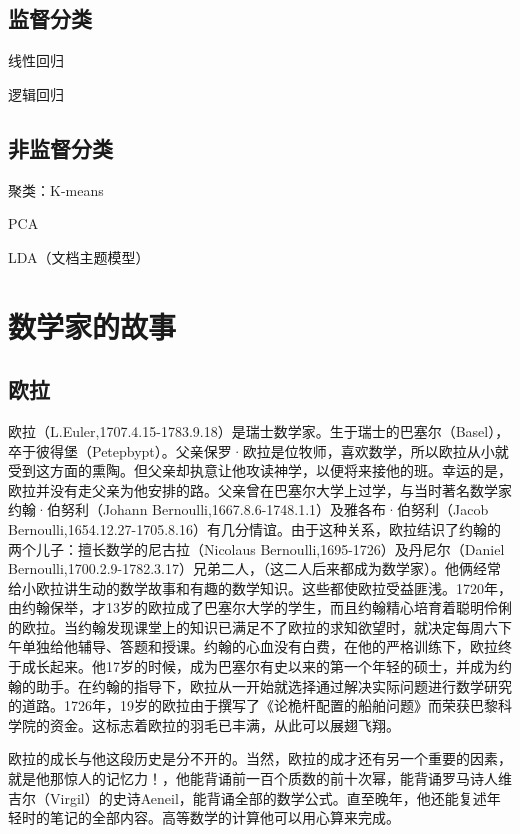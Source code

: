 \documentclass[UTF8]{ctexart}
\begin{document}
\subsection{监督分类}

线性回归

逻辑回归


\subsection{非监督分类}

聚类：K-means

PCA

LDA（文档主题模型）

\section{数学家的故事}

\subsection{欧拉}

欧拉（L.Euler,1707.4.15-1783.9.18）是瑞士数学家。生于瑞士的巴塞尔（Basel），卒于彼得堡（Petepbypt）。父亲保罗·欧拉是位牧师，喜欢数学，所以欧拉从小就受到这方面的熏陶。但父亲却执意让他攻读神学，以便将来接他的班。幸运的是，欧拉并没有走父亲为他安排的路。父亲曾在巴塞尔大学上过学，与当时著名数学家约翰·伯努利（Johann Bernoulli,1667.8.6-1748.1.1）及雅各布·伯努利（Jacob Bernoulli,1654.12.27-1705.8.16）有几分情谊。由于这种关系，欧拉结识了约翰的两个儿子：擅长数学的尼古拉（Nicolaus Bernoulli,1695-1726）及丹尼尔（Daniel Bernoulli,1700.2.9-1782.3.17）兄弟二人，（这二人后来都成为数学家）。他俩经常给小欧拉讲生动的数学故事和有趣的数学知识。这些都使欧拉受益匪浅。1720年，由约翰保举，才13岁的欧拉成了巴塞尔大学的学生，而且约翰精心培育着聪明伶俐的欧拉。当约翰发现课堂上的知识已满足不了欧拉的求知欲望时，就决定每周六下午单独给他辅导、答题和授课。约翰的心血没有白费，在他的严格训练下，欧拉终于成长起来。他17岁的时候，成为巴塞尔有史以来的第一个年轻的硕士，并成为约翰的助手。在约翰的指导下，欧拉从一开始就选择通过解决实际问题进行数学研究的道路。1726年，19岁的欧拉由于撰写了《论桅杆配置的船舶问题》而荣获巴黎科学院的资金。这标志着欧拉的羽毛已丰满，从此可以展翅飞翔。

欧拉的成长与他这段历史是分不开的。当然，欧拉的成才还有另一个重要的因素，就是他那惊人的记忆力！，他能背诵前一百个质数的前十次幂，能背诵罗马诗人维吉尔（Virgil）的史诗Aeneil，能背诵全部的数学公式。直至晚年，他还能复述年轻时的笔记的全部内容。高等数学的计算他可以用心算来完成。
\end{document}
